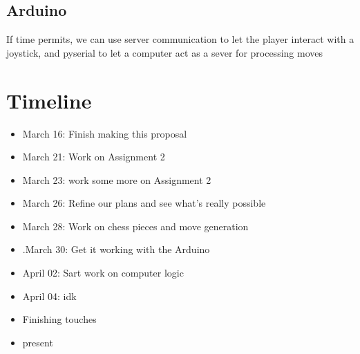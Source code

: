 \documentclass{article}
\begin{document}
    \subsection{Arduino}
    If time permits, we can use server communication to let the player
    interact with a joystick, and pyserial to let a computer act as a sever for processing moves




  \section{Timeline}

  \begin{itemize}
    \item March 16: Finish making this proposal
    \item March 21: Work on Assignment 2
    \item March 23: work some more on Assignment 2
    \item March 26: Refine our plans and see what's really possible
    \item March 28: Work on chess pieces and move generation
    \item.March 30: Get it working with the Arduino
    \item April 02: Sart work on computer logic
    \item April 04: idk
    \item Finishing touches
    \item present
  \end{itemize}
\end{document}
